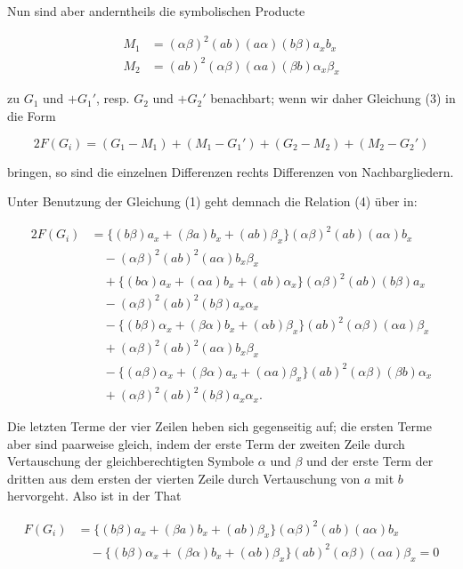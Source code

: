 \documentclass[11pt]{article}
\providecommand{\weq}[2]{\begin{equation}\tag{#1}#2\end{equation}}
\begin{document}
Nun sind aber anderntheils die symbolischen Producte

\[
\begin{aligned}
M_1 &{}= (\alpha\beta)^2 (ab)(a\alpha)(b\beta)a_xb_x\\
M_2 &{}= (ab)^2 (\alpha\beta)(\alpha a)(\beta b)\alpha_x\beta_x
\end{aligned}
\]

zu $G_1$ und $+G_1'$, resp. $G_2$ und $+G_2'$ benachbart; wenn wir daher
Gleichung (3) in die Form

\weq{4}{2F(G_i) = (G_1 - M_1) + (M_1 - G_1') + (G_2 - M_2) + (M_2 - G_2')}

bringen, so sind die einzelnen Differenzen rechts Differenzen von
Nachbargliedern.

Unter Benutzung der Gleichung (1) geht demnach die Relation (4)
über in:

\[
\begin{aligned}
2F(G_i) &{}= \{(b\beta)a_x + (\beta a)b_x + (ab)\beta_x\}(\alpha\beta)^2(ab)(a\alpha)b_x\\
&{}\quad - (\alpha\beta)^2(ab)^2(a\alpha)b_x\beta_x\\
&{}\quad + \{(b\alpha)a_x + (\alpha a)b_x + (ab)\alpha_x\}(\alpha\beta)^2(ab)(b\beta)a_x\\
&{}\quad - (\alpha\beta)^2(ab)^2(b\beta)a_x\alpha_x\\
&{}\quad - \{(b\beta)\alpha_x + (\beta\alpha)b_x + (\alpha b)\beta_x\}(ab)^2(\alpha\beta)(\alpha a)\beta_x
\\
&{}\quad + (\alpha\beta)^2(ab)^2(a\alpha)b_x\beta_x\\
&{}\quad - \{(a\beta)\alpha_x + (\beta\alpha)a_x + (\alpha a)\beta_x\}(ab)^2(\alpha\beta)(\beta b)\alpha_x\\
&{}\quad + (\alpha\beta)^2(ab)^2(b\beta)a_x\alpha_x.
\end{aligned}
\]

Die letzten Terme der vier Zeilen heben sich gegenseitig auf; die
ersten Terme aber sind paarweise gleich, indem der erste Term der
zweiten Zeile durch Vertauschung der gleichberechtigten Symbole $\alpha$
und $\beta$ und der erste Term der dritten aus dem ersten der vierten
Zeile durch Vertauschung von $a$ mit $b$ hervorgeht. Also ist in der
That

\[
\begin{aligned}
F(G_i) &{}= \{(b\beta)a_x + (\beta a)b_x + (ab)\beta_x\}(\alpha\beta)^2(ab)(a\alpha)b_x\\
&{}\quad - \{(b\beta)\alpha_x + (\beta\alpha)b_x + (\alpha b)\beta_x\}(ab)^2(\alpha\beta)(\alpha a)\beta_x = 0
\end{aligned}
\]
\end{document}
